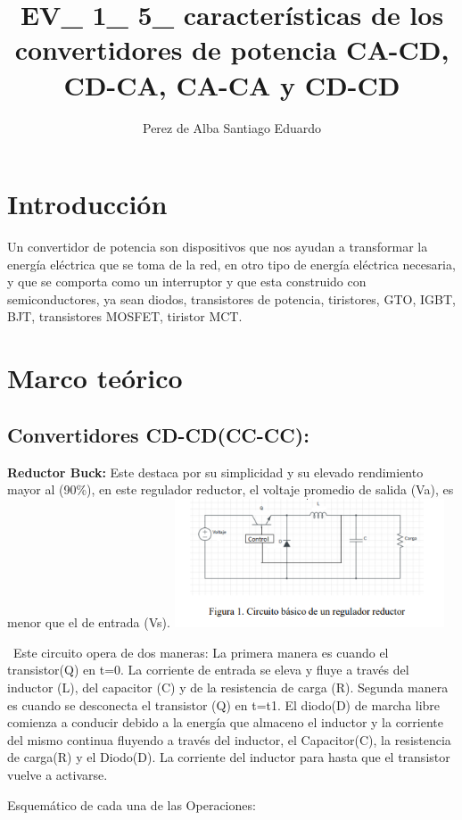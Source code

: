 \documentclass[12pt,letterpaper]{article}
\title{EV\_ 1\_ 5\_ características de los convertidores de potencia CA-CD, CD-CA, CA-CA y CD-CD}
\author{Perez de Alba Santiago Eduardo}
\begin{document}
\maketitle

\section{Introducción}
Un convertidor de potencia son dispositivos que nos ayudan a transformar la energía eléctrica que se toma de la red, en otro tipo de energía eléctrica necesaria, y que se comporta como un interruptor y que esta construido con semiconductores, ya sean diodos, transistores de potencia, tiristores, GTO, IGBT, BJT, transistores MOSFET, tiristor MCT.
\section{Marco teórico}
\subsection{Convertidores CD-CD(CC-CC):} 


\textbf{Reductor Buck:}
Este destaca por su simplicidad y su elevado rendimiento mayor al (90\%), en este regulador reductor, el voltaje promedio de salida (Va), es menor que el de entrada (Vs).
\includegraphics[width= 8cm]{Reductor Buck.png}  
\

\
Este circuito opera de dos maneras:
La primera manera es cuando el transistor(Q) en t=0. La corriente de entrada se eleva y fluye a través del inductor (L), del capacitor (C) y de la resistencia de carga (R).
Segunda manera es cuando se desconecta el transistor (Q) en t=t1. El diodo(D) de marcha libre comienza a conducir debido a la energía que almaceno el inductor y la corriente del mismo continua fluyendo a través del inductor, el Capacitor(C), la resistencia de carga(R) y el Diodo(D). La corriente del inductor para hasta que el transistor vuelve a activarse.

\newpage


Esquemático de cada una de las Operaciones:
\end{document}
